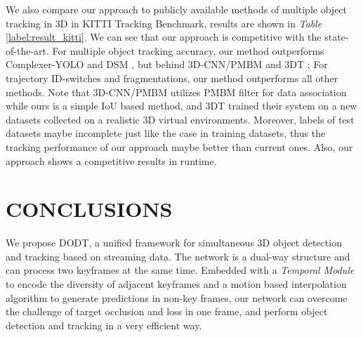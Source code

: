 \documentclass[a4paper, 10pt, conference]{ieeeconf}      %
\def\tablename{\emph{Table}}
\begin{document}
We also compare our approach to publicly available methods of multiple object tracking in 3D in KITTI Tracking Benchmark, results are shown in \tablename \, \ref{label:result_kitti}. We can see that our approach is competitive with the state-of-the-art. For multiple object tracking accuracy, our method outperforms Complexer-YOLO \cite{Simon_2019_CVPR_Workshops} and DSM \cite{frossard2018end}, but behind 3D-CNN/PMBM \cite{scheidegger2018mono} and 3DT \cite{Hu3DT19}; For trajectory ID-switches and fragmentations, our method outperforms all other methods. Note that 3D-CNN/PMBM utilizes PMBM filter for data association while ours is a simple IoU based method, and 3DT trained their system on a new datasets collected on a realistic 3D virtual environments. Moreover, labels of test datasets maybe incomplete just like the case in training datasets, thus the tracking performance of our approach maybe better than current ones. Also, our approach shows a competitive results in runtime.

\section{CONCLUSIONS}
\label{sec:conclusions} We propose DODT, a unified framework for simultaneous 3D object detection and tracking based on streaming data. The network is a dual-way structure and can  process two keyframes at the same time. Embedded with a \textit{Temporal Module} to encode the diversity of adjacent keyframes and a motion based interpolation algorithm to generate predictions in non-key frames, our network can overcome the challenge of target occlusion and loss in one frame, and perform object detection and tracking in a very efficient way. 




\end{document}
